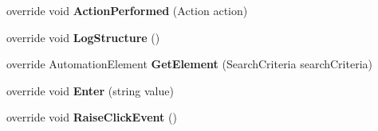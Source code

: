 \begin{DoxyCompactItemize}
\item 
\hypertarget{class_proto_test_1_1_golem_1_1_white_1_1_elements_1_1_white_button_afb87dba2e819472e6642abe3301a210f}{override void {\bfseries Action\-Performed} (Action action)}\label{class_proto_test_1_1_golem_1_1_white_1_1_elements_1_1_white_button_afb87dba2e819472e6642abe3301a210f}

\item 
\hypertarget{class_proto_test_1_1_golem_1_1_white_1_1_elements_1_1_white_button_ae33313ab9f9da4013d2db0952921a599}{override void {\bfseries Log\-Structure} ()}\label{class_proto_test_1_1_golem_1_1_white_1_1_elements_1_1_white_button_ae33313ab9f9da4013d2db0952921a599}

\item 
\hypertarget{class_proto_test_1_1_golem_1_1_white_1_1_elements_1_1_white_button_ab133034acfe795949fb3a913e5b96841}{override Automation\-Element {\bfseries Get\-Element} (Search\-Criteria search\-Criteria)}\label{class_proto_test_1_1_golem_1_1_white_1_1_elements_1_1_white_button_ab133034acfe795949fb3a913e5b96841}

\item 
\hypertarget{class_proto_test_1_1_golem_1_1_white_1_1_elements_1_1_white_button_a18253e807968d5a6668738d05dec4cf0}{override void {\bfseries Enter} (string value)}\label{class_proto_test_1_1_golem_1_1_white_1_1_elements_1_1_white_button_a18253e807968d5a6668738d05dec4cf0}

\item 
\hypertarget{class_proto_test_1_1_golem_1_1_white_1_1_elements_1_1_white_button_ab17ab8181f2b868ca1eb80610582cd61}{override void {\bfseries Raise\-Click\-Event} ()}\label{class_proto_test_1_1_golem_1_1_white_1_1_elements_1_1_white_button_ab17ab8181f2b868ca1eb80610582cd61}

\end{DoxyCompactItemize}
